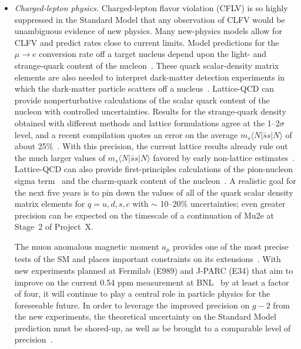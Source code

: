 \begin{itemize}
\item {\it Charged-lepton physics.}  Charged-lepton flavor violation (CFLV) is so highly suppressed in the Standard Model that any observation of
CLFV would be unambiguous evidence of new physics.
Many new-physics models allow for CLFV and predict rates close to current limits.
Model predictions for the $\mu \to e$ conversion rate off a target nucleus depend upon the light- and
strange-quark content of the nucleon~\cite{Cirigliano:2009bz}.
These quark scalar-density matrix elements are also needed to
interpret dark-matter detection experiments in which the dark-matter particle scatters off a
nucleus~\cite{Bottino:1999ei,Ellis:2008hf,Hill:2011be}.
Lattice-QCD can provide nonperturbative calculations of the scalar quark content of the nucleon with
controlled uncertainties.
Results for the strange-quark density obtained with different methods and lattice formulations agree at the 1--2$\sigma$ level, and a
recent compilation quotes an error on the average $m_s \langle N| \bar{s}s|N \rangle$ of about
25\%~\cite{Junnarkar:2013ac}.
With this precision, the current lattice results already rule out the much larger values of 
$m_s\langle N|\bar{s}s|N\rangle$ favored by early non-lattice
estimates~\cite{Nelson:1987dg,Kaplan:1988ku,Jaffe:1989mj}.
Lattice-QCD can also provide first-principles calculations of the pion-nucleon sigma
term~\cite{Young:2009zb,Durr:2011mp,Horsley:2011wr,Dinter:2012tt,Shanahan:2012wh} and the charm-quark content
of the nucleon~\cite{Freeman:2012ry,Gong:2013vja}.
A realistic goal for the next five years is to pin down the values of all of the quark scalar density matrix
elements for $q=u,d,s,c$ with $\sim$ 10--20\% uncertainties; even greater precision can be expected on the
timescale of a continuation of Mu2e at Stage~2 of Project~X.

The muon anomalous magnetic moment $a_\mu$ provides one of the most precise tests of the SM and places important constraints on its extensions~\cite{Hewett:2012ns}.
With new experiments planned at Fermilab (E989) and J-PARC (E34) that aim to improve on the current 0.54 ppm measurement at BNL~\cite{Bennett:2006fi} by at least a factor of four, it will continue to play a central
role in particle physics for the foreseeable future.
In order to leverage the improved precision on $g-2$ from the new experiments, the theoretical uncertainty on the Standard Model prediction must be shored-up, as well as be brought to a comparable level of
precision~\cite{Hewett:2012ns}.  


\end{itemize}
